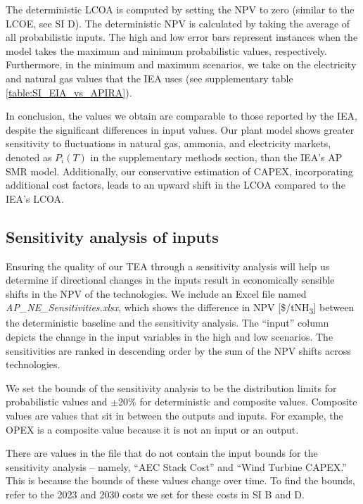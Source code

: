 \documentclass{article}
\begin{document}
The deterministic LCOA is computed by setting the NPV to zero (similar to the LCOE, see SI D). The deterministic NPV is calculated by taking the average of all probabilistic inputs. The high and low error bars represent instances when the model takes the maximum and minimum probabilistic values, respectively. Furthermore, in the minimum and maximum scenarios, we take on the electricity and natural gas values that the IEA uses (see supplementary table \ref{table:SI_EIA_vs_APIRA}).

In conclusion, the values we obtain are comparable to those reported by the IEA, despite the significant differences in input values. Our plant model shows greater sensitivity to fluctuations in natural gas, ammonia, and electricity markets, denoted as $P_i(T)$ in the supplementary methods section, than the IEA’s AP SMR model. Additionally, our conservative estimation of CAPEX, incorporating additional cost factors, leads to an upward shift in the LCOA compared to the IEA’s LCOA.

\subsection{Sensitivity analysis of inputs}



Ensuring the quality of our TEA through a sensitivity analysis will help us determine if directional changes in the inputs result in economically sensible shifts in the NPV of the technologies. We include an Excel file named \textit{AP\_NE\_Sensitivities.xlsx}, which shows the difference in NPV [\$/tNH\textsubscript{3}] between the deterministic baseline and the sensitivity analysis. The “input” column depicts the change in the input variables in the high and low scenarios. The sensitivities are ranked in descending order by the sum of the NPV shifts across technologies.

We set the bounds of the sensitivity analysis to be the distribution limits for probabilistic values and $\pm$20\% for deterministic and composite values. Composite values are values that sit in between the outputs and inputs. For example, the OPEX is a composite value because it is not an input or an output.

There are values in the file that do not contain the input bounds for the sensitivity analysis – namely, “AEC Stack Cost” and “Wind Turbine CAPEX.” This is because the bounds of these values change over time. To find the bounds, refer to the 2023 and 2030 costs we set for these costs in SI B and D.
\end{document}
